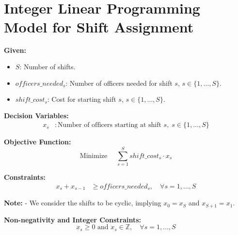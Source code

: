 \documentclass{article}
\begin{document}
\section*{Integer Linear Programming Model for Shift Assignment}

\textbf{Given:}
\begin{itemize}
    \item $S$: Number of shifts.
    \item $officers\_needed_s$: Number of officers needed for shift $s$, $s \in \{1, \ldots, S\}$.
    \item $shift\_cost_s$: Cost for starting shift $s$, $s \in \{1, \ldots, S\}$.
\end{itemize}

\textbf{Decision Variables:}
\begin{align*}
    x_s &: \text{Number of officers starting at shift } s, \; s \in \{1, \ldots, S\}
\end{align*}

\textbf{Objective Function:}
\[
\text{Minimize } \quad \sum_{s=1}^{S} shift\_cost_s \cdot x_s
\]

\textbf{Constraints:}
\begin{align*}
    x_s + x_{s-1} &\geq officers\_needed_s, \quad \forall s = 1, \ldots, S
\end{align*}

\textbf{Note:}
- We consider the shifts to be cyclic, implying $x_0 = x_S$ and $x_{S+1} = x_1$.

\textbf{Non-negativity and Integer Constraints:}
\[
x_s \geq 0 \text{ and } x_s \in \mathbb{Z}, \quad \forall s = 1, \ldots, S
\]
\end{document}
